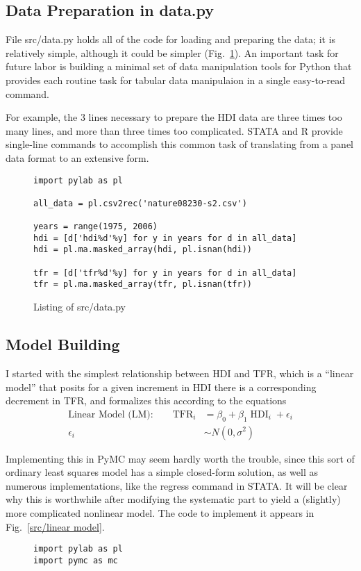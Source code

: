 \documentclass[10pt]{bmc_article}
\def\TFR{\operatorname{TFR}}
\def\HDI{\operatorname{HDI}}
\newenvironment{bmcformat}{\begin{raggedright}\baselineskip20pt\sloppy\setboolean{publ}{false}}{\end{raggedright}\baselineskip20pt\sloppy}
\begin{document}
\begin{bmcformat}
  \subsection*{Data Preparation in data.py}
  File src/data.py holds all of the code for loading and preparing the
  data; it is relatively simple, although it could be simpler
  (Fig.~\ref{src/data.py}).  An important task for future labor is
  building a minimal set of data manipulation tools for Python that
  provides each routine task for tabular data manipulaion in a single
  easy-to-read command.

  For example, the 3 lines necessary to prepare the HDI data are three
  times too many lines, and more than three times too complicated.
  STATA and R provide single-line commands to accomplish this common
  task of translating from a panel data format to an extensive form.
\begin{figure}
\begin{verbatim}
import pylab as pl

all_data = pl.csv2rec('nature08230-s2.csv')

years = range(1975, 2006)
hdi = [d['hdi%d'%y] for y in years for d in all_data]
hdi = pl.ma.masked_array(hdi, pl.isnan(hdi))

tfr = [d['tfr%d'%y] for y in years for d in all_data]
tfr = pl.ma.masked_array(tfr, pl.isnan(tfr))
\end{verbatim}
\caption{Listing of src/data.py}
\label{src/data.py}
\end{figure}

  \subsection*{Model Building}
I started with the simplest relationship between HDI and TFR, which is
a ``linear model'' that posits for a given increment in HDI there is a
corresponding decrement in TFR, and formalizes this according to the
equations
\begin{align*}
\text{Linear Model (LM):}\qquad
\TFR_i &= \beta_0 + \beta_1 \HDI_i + \epsilon_i\\
\epsilon_i &\sim N(0, \sigma^2)
\end{align*}

Implementing this in PyMC may seem hardly worth the trouble, since
this sort of ordinary least squares model has a simple closed-form
solution, as well as numerous implementations, like the regress
command in STATA.  It will be clear why this is worthwhile after
modifying the systematic part to yield a (slightly) more complicated
nonlinear model.  The code to implement it appears in
Fig.~\ref{src/linear model}.
\begin{figure}
\begin{verbatim}
import pylab as pl
import pymc as mc


\end{verbatim}
\end{figure}
\end{bmcformat}
\end{document}
